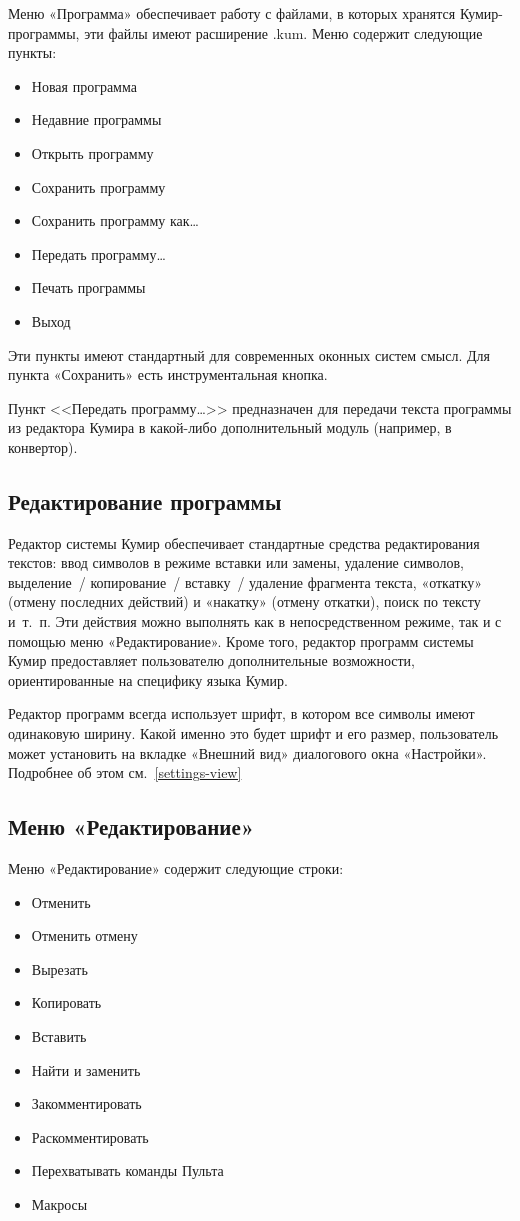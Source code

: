 Меню «Программа» обеспечивает работу с файлами, в которых хранятся Кумир-прог\-рам\-мы, эти файлы имеют расширение .kum. Меню содержит следующие пункты:
\begin{itemize}
\item Новая программа
\item Недавние программы
\item Открыть программу
\item Сохранить программу
\item Сохранить программу как\dots
\item Передать программу\dots
\item Печать программы
\item Выход
\end{itemize}

Эти пункты имеют стандартный для современных оконных систем смысл. Для пункта «Сохранить» есть инструментальная кнопка.

Пункт <<Передать программу\dots>> предназначен для передачи текста программы из редактора Кумира в какой-либо дополнительный модуль (например, в конвертор).

\subsection{Редактирование программы}

Редактор системы Кумир обеспечивает стандартные средства редактирования текстов: ввод символов в режиме вставки или замены, удаление символов, выделение~/ копирование~/ вставку~/ удаление фрагмента текста, «откатку» (отмену последних действий) и «накатку» (отмену откатки), поиск по тексту и~т.~п. Эти действия можно выполнять как в непосредственном режиме, так и с помощью меню «Редактирование». Кроме того, редактор программ системы Кумир предоставляет пользователю дополнительные возможности, ориентированные на специфику языка Кумир.

Редактор программ всегда использует шрифт, в котором все символы имеют одинаковую ширину. Какой именно это будет шрифт и его размер, пользователь может установить на вкладке «Внешний вид» диалогового окна «Настройки». Подробнее об этом см.~\ref{settings-view} 

\subsection{Меню «Редактирование»}

Меню «Редактирование» содержит следующие строки:
\begin{itemize}
\item		Отменить
\item		Отменить отмену
\item		Вырезать
\item		Копировать
\item		Вставить
\item		Найти и заменить
\item		Закомментировать
\item		Раскомментировать
\item		Перехватывать команды Пульта
\item		Макросы
\end{itemize}

